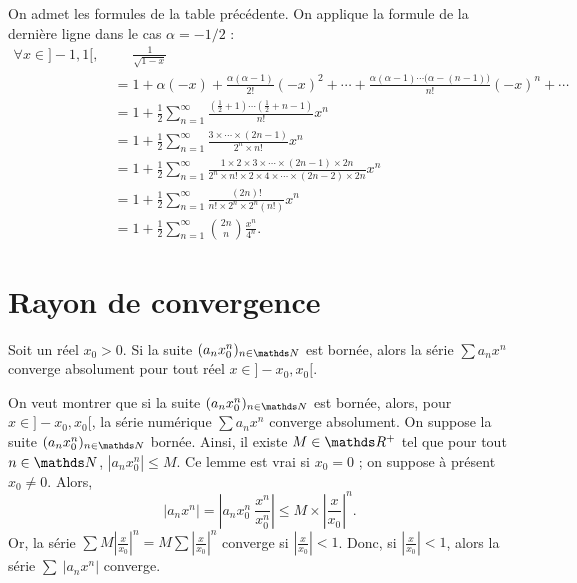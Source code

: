 \begin{exo}
	On admet les formules de la table précédente. On applique la formule de la dernière ligne dans le cas $\alpha = - 1 / 2$ :
	\begin{align*}
		\forall x \in {]-1,1[},\: &\mathrel{\phantom=}\frac{1}{\sqrt{1-x}}\\
		&= 1 + \alpha (-x) + \frac{\alpha (\alpha - 1)}{2!}(-x)^2 + \cdots + \frac{\alpha (\alpha-1) \cdots \big(\alpha - (n-1)\big)}{n!} (-x)^n + \cdots \\
		&= 1 + \frac{1}{2} \sum_{n=1}^\infty \frac{\left( \frac{1}{2} + 1 \right) \cdots (\frac{1}{2} + n - 1)}{n!} x^n  \\
		&= 1 + \frac{1}{2} \sum_{n=1}^\infty\frac{3 \times \cdots \times (2n - 1)}{2^n \times n!} x^n \\
		&= 1 + \frac{1}{2} \sum_{n=1}^\infty \frac{1 \times 2 \times 3 \times \cdots \times (2n-1)\times 2n}{2^n \times n! \times 2 \times 4 \times \cdots \times (2n-2) \times 2n} x^n \\
		&= 1 + \frac{1}{2} \sum_{n=1}^\infty \frac{(2n)!}{n! \times 2^n \times 2^n(n!)} x^n \\
		&= 1 + \frac{1}{2} \sum_{n=1}^\infty {2n \choose n} \frac{x^n}{4^n}.
	\end{align*}
\end{exo}

\section{Rayon de convergence}

\begin{lem}
	Soit un réel $x_0 > 0$. Si la suite $(a_n x_0^n)_{n\in\N}$\/ est bornée, alors la série $\sum a_n x^n$\/ converge absolument pour tout réel $x \in {]-x_0,x_0[}$.
\end{lem}

\begin{prv}
	On veut montrer que si la suite $(a_n x_0^n)_{n\in\N}$\/ est bornée, alors, pour $x \in {]-x_0,x_0[}$, la série numérique $\sum a_n x^n$\/ converge absolument.
	On suppose la suite $(a_nx_0^n)_{n \in \N}$\/ bornée.
	Ainsi, il existe $M \in \R^+$\/ tel que pour tout $n \in \N$, $|a_n x_0^n| \le M$.
	Ce lemme est vrai si $x_0 = 0$\/ ; on suppose à présent $x_0 \neq 0$.
	Alors,
	\[
		|a_n x^n| = \left| a_n x^n_0\:\frac{x^n}{x_0^n} \right|
		\le M \times \left| \frac{x}{x_0} \right|^n
	.\]
	Or, la série $\sum M \left| \frac{x}{x_0} \right|^n = M \sum \left| \frac{x}{x_0} \right|^n$\/ converge si $\left| \frac{x}{x_0} \right| < 1$. Donc, si $\left| \frac{x}{x_0} \right| < 1$, alors la série $\sum\:|a_n x^n|$\/ converge.
\end{prv}


